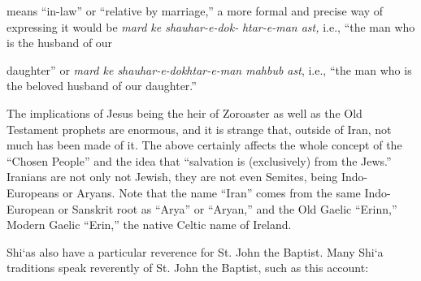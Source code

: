 means ``in-law'' or ``relative by marriage,'' a more formal and precise way of expressing it would be \emph{mard ke shauhar-e-dok-}
\emph{htar-e-man ast,} i.e., ``the man who is the husband of our

daughter'' or \emph{mard ke shauhar-e-dokhtar-e-man mahbub ast}, i.e., ``the man who is the beloved husband of our daughter.''

The implications of Jesus being the heir of Zoroaster as well as the Old Testament prophets are enormous, and it is strange that, outside of Iran, not much has been made of it. The above certainly affects the whole concept of the ``Chosen People'' and the idea that ``salvation is (exclusively) from the Jews.'' Iranians are not only not Jewish, they are not even Semites, being Indo-Europeans or Aryans. Note that the name ``Iran'' comes from the same Indo-European or Sanskrit root as ``Arya'' or ``Aryan,'' and the Old Gaelic ``Erinn,'' Modern Gaelic ``Erin,'' the native Celtic name of Ireland.

Shi`as also have a particular reverence for St. John the Baptist. Many Shi`a traditions speak reverently of St. John the Baptist, such as this account:

